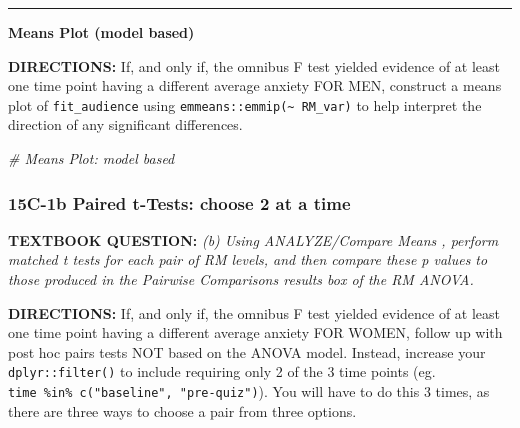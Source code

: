 \documentclass[]{article}
\newenvironment{Shaded}{\begin{snugshade}}{\end{snugshade}}
\newcommand{\KeywordTok}[1]{\textcolor[rgb]{0.13,0.29,0.53}{\textbf{#1}}}
\newcommand{\DataTypeTok}[1]{\textcolor[rgb]{0.13,0.29,0.53}{#1}}
\newcommand{\StringTok}[1]{\textcolor[rgb]{0.31,0.60,0.02}{#1}}
\newcommand{\CommentTok}[1]{\textcolor[rgb]{0.56,0.35,0.01}{\textit{#1}}}
\newcommand{\OtherTok}[1]{\textcolor[rgb]{0.56,0.35,0.01}{#1}}
\newcommand{\OperatorTok}[1]{\textcolor[rgb]{0.81,0.36,0.00}{\textbf{#1}}}
\newcommand{\NormalTok}[1]{#1}
\begin{document}
\begin{center}\rule{0.5\linewidth}{\linethickness}\end{center}

\textbf{Means Plot (model based)}

\textbf{DIRECTIONS:} If, and only if, the omnibus F test yielded
evidence of at least one time point having a different average anxiety
FOR MEN, construct a means plot of \texttt{fit\_audience} using
\texttt{emmeans::emmip(\textasciitilde{}\ RM\_var)} to help interpret
the direction of any significant differences.

\begin{Shaded}
\begin{Highlighting}[]
\CommentTok{# Means Plot: model based}
\end{Highlighting}
\end{Shaded}

\clearpage

\subsubsection{15C-1b Paired t-Tests: choose 2 at a
time}\label{c-1b-paired-t-tests-choose-2-at-a-time}

\textbf{TEXTBOOK QUESTION:} \emph{(b) Using ANALYZE/Compare Means ,
perform matched t tests for each pair of RM levels, and then compare
these p values to those produced in the Pairwise Comparisons results box
of the RM ANOVA.}

\textbf{DIRECTIONS:} If, and only if, the omnibus F test yielded
evidence of at least one time point having a different average anxiety
FOR WOMEN, follow up with post hoc pairs tests NOT based on the ANOVA
model. Instead, increase your \texttt{dplyr::filter()} to include
requiring only 2 of the 3 time points (eg.
\texttt{time\ \%in\%\ c("baseline",\ "pre-quiz")}). You will have to do
this 3 times, as there are three ways to choose a pair from three
options.

\begin{Shaded}
\end{Shaded}
\end{document}
